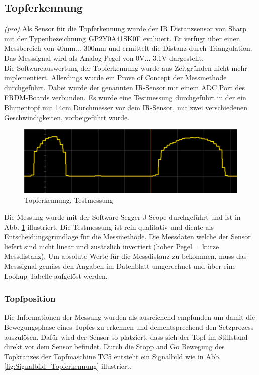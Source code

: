 \subsection{Topferkennung} \label{sec:Topferkennung}

\textit{(pro)} Als Sensor für die Topferkennung wurde der IR Distanzsensor von Sharp mit der Typenbezeichnung GP2Y0A41SK0F evaluiert. Er verfügt über einen Messbereich von 40mm... 300mm und ermittelt die Distanz durch Triangulation. Das Messsignal wird als Analog Pegel von 0V... 3.1V dargestellt.\\
Die Softwareauswertung der Topferkennung wurde aus Zeitgründen nicht mehr implementiert. Allerdings wurde ein Prove of Concept der Messmethode durchgeführt. Dabei wurde der genannten IR-Sensor mit einem ADC Port des FRDM-Boards verbunden. Es wurde eine Testmessung durchgeführt in der ein Blumentopf mit 14cm Durchmesser vor dem IR-Sensor, mit zwei verschiedenen Geschwindigkeiten, vorbeigeführt wurde. 

\begin{figure}[H]
	\includegraphics[width=1\textwidth]{Illustrationen/6-Umsetzung/IR_Sensor_Messung.png}
	\caption{Topferkennung, Testmessung}
	\label{fig:IR_Sensor_POC}
\end{figure}

Die Messung wurde mit der Software Segger J-Scope durchgeführt und ist in Abb. \ref{fig:IR_Sensor_POC} illustriert. Die Testmessung ist rein qualitativ und diente als Entscheidungsgrundlage für die Messmethode. Die Messdaten welche der Sensor liefert sind nicht linear und zusätzlich invertiert (hoher Pegel = kurze Messdistanz). Um absolute Werte für die Messdistanz zu bekommen, muss das Messsignal gemäss den Angaben im Datenblatt umgerechnet und über eine Lookup-Tabelle aufgelöst werden.

\subsubsection{Topfposition}
Die Informationen der Messung wurden als ausreichend empfunden um damit die Bewegungsphase eines Topfes zu erkennen und dementsprechend den Setzprozess auszulösen. Dafür wird der Sensor so platziert, dass sich der Topf im Stillstand direkt vor dem Sensor befindet. Durch die Stopp and Go Bewegung des Topkranzes der Topfmaschine TC5 entsteht ein Signalbild wie in Abb. \ref{fig:Signalbild_Topferkennung} illustriert.\\


